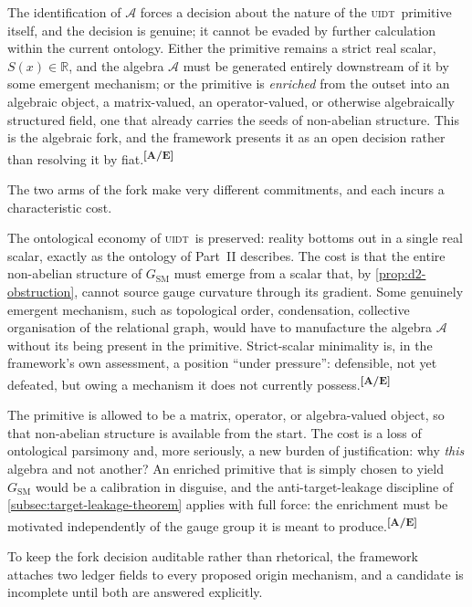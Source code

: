 \documentclass[12pt,a4paper,twoside]{article}
\theoremstyle{plain}
\theoremstyle{definition}
\theoremstyle{remark}
\newcommand{\UIDT}{\textsc{uidt}}
\newcommand{\catmark}[1]{\textsuperscript{\textsf{\textbf{[#1]}}}}
\begin{document}
The identification of $\mathcal{A}$ forces a decision about the nature of the \UIDT\ primitive itself, and the decision is genuine; it cannot be evaded by further calculation within the current ontology. Either the primitive remains a strict real scalar, $S(x)\in\mathbb{R}$, and the algebra $\mathcal{A}$ must be generated entirely downstream of it by some emergent mechanism; or the primitive is \emph{enriched} from the outset into an algebraic object, a matrix-valued, an operator-valued, or otherwise algebraically structured field, one that already carries the seeds of non-abelian structure. This is the algebraic fork, and the framework presents it as an open decision rather than resolving it by fiat.\catmark{A/E}

The two arms of the fork make very different commitments, and each incurs a characteristic cost.

\begin{description}[leftmargin=1.4em,style=nextline]
\item[Arm 1: Strict scalar primitive.] The ontological economy of \UIDT\ is preserved: reality bottoms out in a single real scalar, exactly as the ontology of Part~II describes. The cost is that the entire non-abelian structure of $G_{\mathrm{SM}}$ must emerge from a scalar that, by \cref{prop:d2-obstruction}, cannot source gauge curvature through its gradient. Some genuinely emergent mechanism, such as topological order, condensation, collective organisation of the relational graph, would have to manufacture the algebra $\mathcal{A}$ without its being present in the primitive. Strict-scalar minimality is, in the framework's own assessment, a position ``under pressure'': defensible, not yet defeated, but owing a mechanism it does not currently possess.\catmark{A/E} \item[Arm 2: Enriched algebraic primitive.] The primitive is allowed to be a matrix, operator, or algebra-valued object, so that non-abelian structure is available from the start. The cost is a loss of ontological parsimony and, more seriously, a new burden of justification: why \emph{this} algebra and not another? An enriched primitive that is simply chosen to yield $G_{\mathrm{SM}}$ would be a calibration in disguise, and the anti-target-leakage discipline of \cref{subsec:target-leakage-theorem} applies with full force: the enrichment must be motivated independently of the gauge group it is meant to produce.\catmark{A/E}
\end{description}

\noindent To keep the fork decision auditable rather than rhetorical, the framework attaches two ledger fields to every proposed origin mechanism, and a candidate is incomplete until both are answered explicitly.
\end{document}

